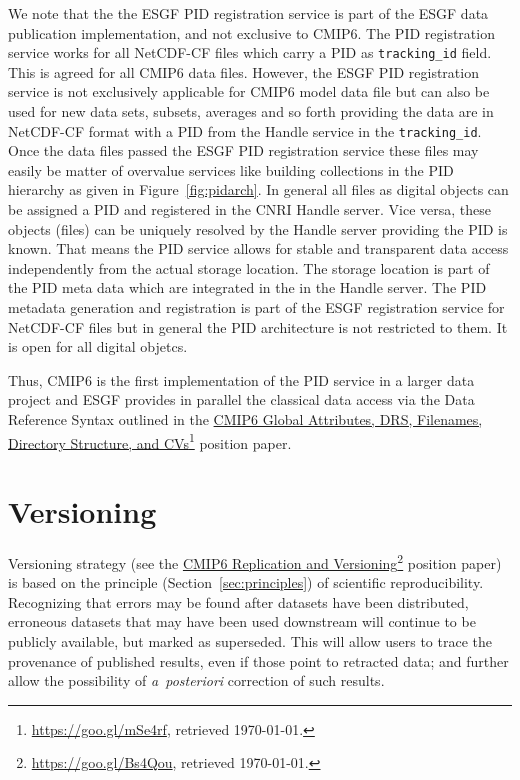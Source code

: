 \documentclass[gmd,manuscript]{copernicus}
\newcommand{\pllabel}[1]{\label{p-#1}\linelabel{l-#1}}
\newcommand{\urlref}[2] {\href{#1}{#2}\footnote{\url{#1}, retrieved \today.}}
\begin{document}
\pllabel{RC1-57}
We note that the the ESGF PID registration service is part of the ESGF
data publication implementation, and not exclusive to CMIP6. The PID
registration service works for all NetCDF-CF files which carry a PID
as \texttt{tracking\_id} field. This is agreed for all CMIP6 data
files. However, the ESGF PID registration service is not exclusively
applicable for CMIP6 model data file but can also be used for new data
sets, subsets, averages and so forth providing the data are in
NetCDF-CF format with a PID from the Handle service in the
\texttt{tracking\_id}. Once the data files passed the ESGF PID
registration service these files may easily be matter of overvalue
services like building collections in the PID hierarchy as given in
Figure~\ref{fig:pidarch}. In general all files as digital objects can
be assigned a PID and registered in the CNRI Handle server. Vice
versa, these objects (files) can be uniquely resolved by the Handle
server providing the PID is known. That means the PID service allows
for stable and transparent data access independently from the actual
storage location. The storage location is part of the PID meta data
which are integrated in the in the Handle server. The PID metadata
generation and registration is part of the ESGF registration service
for NetCDF-CF files but in general the PID architecture is not
restricted to them. It is open for all digital objetcs.

Thus, CMIP6 is the first implementation of the PID service in a larger
data project and ESGF provides in parallel the classical data access
via the Data Reference Syntax outlined in the
\urlref{https://goo.gl/mSe4rf}{CMIP6 Global Attributes, DRS,
  Filenames, Directory Structure, and CVs} position paper.

\section{Versioning}
\label{sec:version}

Versioning strategy (see the \urlref{https://goo.gl/Bs4Qou}{CMIP6
  Replication and Versioning} position paper) is based on the
principle (Section~\ref{sec:principles}) of scientific
reproducibility. Recognizing that errors may be found after datasets
have been distributed, erroneous datasets that may have been used
downstream will continue to be publicly available, but marked as
superseded. This will allow users to trace the provenance of published
results, even if those point to retracted data; and further allow the
possibility of \emph{a~posteriori} correction of such results.
\end{document}
